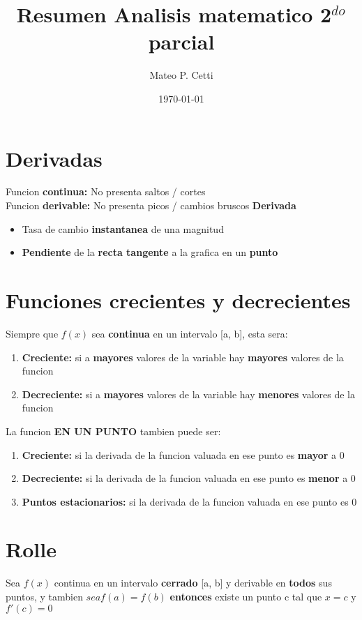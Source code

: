 \documentclass[11pt]{article}
\title{ Resumen Analisis matematico 2$^{do}$ parcial}
\author{ Mateo P. Cetti }
\date{\today}
\begin{document}
\maketitle	
\pagebreak



\section{Derivadas}
Funcion \textbf{continua: }No presenta saltos / cortes\\
Funcion \textbf{derivable: } No presenta picos / cambios bruscos
\textbf{Derivada}
\begin{itemize}
	\item Tasa de cambio \textbf{instantanea} de una magnitud
	\item \textbf{Pendiente} de la \textbf{recta tangente} a la grafica en un \textbf{punto}
\end{itemize}
\section{Funciones crecientes y decrecientes}
Siempre que $f(x)$ sea \textbf{continua} en un intervalo [a, b], esta sera:
\begin{enumerate}
	\item \textbf{Creciente: }si a \textbf{mayores} valores de la variable hay \textbf{mayores} valores de la funcion
	\item \textbf{Decreciente: }si a \textbf{mayores} valores de la variable hay \textbf{menores} valores de la funcion
\end{enumerate}
La funcion \textbf{EN UN PUNTO} tambien puede ser:
\begin{enumerate}
	\item \textbf{Creciente: }si la derivada de la funcion valuada en ese punto es  \textbf{mayor} a 0
	\item \textbf{Decreciente: }si la derivada de la funcion valuada en ese punto es \textbf{menor} a 0
	\item \textbf{Puntos estacionarios: }si la derivada de la funcion valuada en ese punto es 0
\end{enumerate}
\section{Rolle}
Sea $f(x)$ continua en un intervalo \textbf{cerrado} [a, b] y derivable en \textbf{todos} sus puntos, y tambien $sea f(a) = f(b)$ \textbf{entonces} existe un punto c tal que $x=c$ y $f'(c) = 0$
\end{document}
